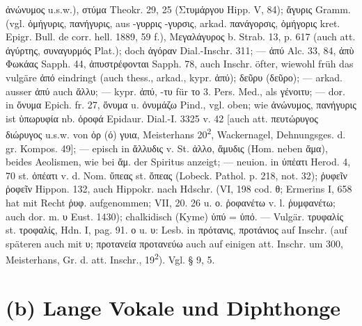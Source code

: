ἀνώνυμος u.s.w.), στύμα Theokr. 29, 25 (Στυμάργου Hipp. V, 84); ἄγυρις Gramm. (vgl. ὁμήγυρις, πανήγυρις, aus -γυρρις -γυρσις, arkad. πανάγορσις, ὁμήγορις kret. Epigr. Bull. de corr. hell. 1889, 59 f.), Μεγαλάγυρος b. Strab. 13, p. 617 (auch att. ἀγύρτης, συναγυρμός Plat.); doch ἀγόραν Dial.-Inschr. 311; — ἀπύ Alc. 33, 84, ἀπὺ Φωκάας Sapph. 44, ἀπυστρέφονται Sapph. 78, auch Inschr. öfter, wiewohl früh das vulgäre ἀπό eindringt (auch thess., arkad., kypr. ἀπύ); δεῦρυ (δεῦρο); — arkad. ausser ἀπύ auch ἄλλυ; — kypr. ἀπύ, -τυ für το 3. Pers. Med., als γένοιτυ; — dor. in ὄνυμα Epich. fr. 27, ὄνυμα u. ὀνυμάζω Pind., vgl. oben; wie ἀνώνυμος, πανήγυρις ist ὑπωρυφία nb. ὀροφά Epidaur. Dial.-I. 3325 v. 42 [auch att. πευτώρυγος διώρυγος u.s.w. von ὀρ (ό) γυια, Meisterhans 20\textsuperscript{2}, Wackernagel, Dehnungsges. d. gr. Kompos. 49]; — episch in ἄλλυδις v. St. ἀλλο, ἄμυδις (Hom. neben ἅμα), beides Aeolismen, wie bei ἄμ. der Spiritus anzeigt; — neuion. in ὐπέατι Herod. 4, 70 st. ὀπέατι v. d. Nom. ὔπεας st. ὄπεας (Lobeck. Pathol. p. 218, not. 32); ῥυφεῖν ῥοφεῖν Hippon. 132, auch Hippokr. nach Hdschr. (VI, 198 cod. θ; Ermerins I, 658 hat mit Recht ῥυφ. aufgenommen; VII, 20. 26 u. ο. ῥοφανέτω v. l. ῥυμφανέτω; auch dor. m. υ Eust. 1430); chalkidisch (Kyme) ὑπύ = ὑπό. — Vulgär. τρυφαλίς st. τροφαλίς, Hdn. I, pag. 91. ο u. υ: Lesb. in πρότανις, προτάνιος auf Inschr. (auf späteren auch mit υ; προτανεία προτανεύω auch auf einigen att. Inschr. um 300, Meisterhans, Gr. d. att. Inschr., 19\textsuperscript{2}). Vgl. § 9, 5.
\section{(b) Lange Vokale und Diphthonge}

